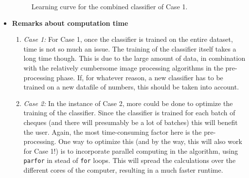 \begin{itemize}
\begin{figure}[H]
	\caption{Learning curve for the combined classifier of Case 1.}
	\label{fig:learning}
\end{figure}
	\item \textbf{Remarks about computation time}
	\begin{enumerate}
		\item \textit{Case 1:} For Case 1, once the classifier is trained on the entire dataset, time is not so much an issue. The training of the classifier itself takes a long time though. This is due to the large amount of data, in combination with the relatively cumbersome image processing algorithms in the pre-processing phase. If, for whatever reason, a new classifier has to be trained on a new datafile of numbers, this should be taken into account.
		\item \textit{Case 2:} In the instance of Case 2, more could be done to optimize the training of the classifier. Since the classifier is trained for each batch of cheques (and there will presumably be a lot of batches) this will benefit the user. Again, the most time-consuming factor here is the pre-processing. One way to optimize this (and by the way, this will also work for Case 1!) is to incorporate parallel computing in the algorithm, using \texttt{parfor} in stead of \texttt{for} loops. This will spread the calculations over the different cores of the computer, resulting in a much faster runtime.
	\end{enumerate}
\end{itemize}